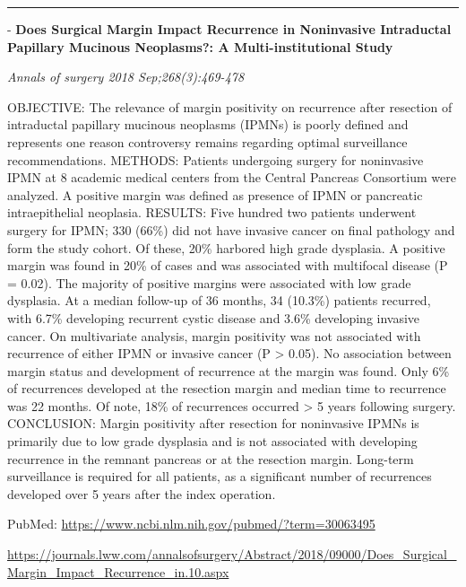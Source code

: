 \documentclass[]{article}
\begin{document}
\begin{center}\rule{0.5\linewidth}{\linethickness}\end{center}

 - \textbf{Does Surgical Margin Impact Recurrence in Noninvasive
Intraductal Papillary Mucinous Neoplasms?: A Multi-institutional Study}

\emph{Annals of surgery 2018 Sep;268(3):469-478}

OBJECTIVE: The relevance of margin positivity on recurrence after
resection of intraductal papillary mucinous neoplasms (IPMNs) is poorly
defined and represents one reason controversy remains regarding optimal
surveillance recommendations. METHODS: Patients undergoing surgery for
noninvasive IPMN at 8 academic medical centers from the Central Pancreas
Consortium were analyzed. A positive margin was defined as presence of
IPMN or pancreatic intraepithelial neoplasia. RESULTS: Five hundred two
patients underwent surgery for IPMN; 330 (66\%) did not have invasive
cancer on final pathology and form the study cohort. Of these, 20\%
harbored high grade dysplasia. A positive margin was found in 20\% of
cases and was associated with multifocal disease (P = 0.02). The
majority of positive margins were associated with low grade dysplasia.
At a median follow-up of 36 months, 34 (10.3\%) patients recurred, with
6.7\% developing recurrent cystic disease and 3.6\% developing invasive
cancer. On multivariate analysis, margin positivity was not associated
with recurrence of either IPMN or invasive cancer (P \textgreater{}
0.05). No association between margin status and development of
recurrence at the margin was found. Only 6\% of recurrences developed at
the resection margin and median time to recurrence was 22 months. Of
note, 18\% of recurrences occurred \textgreater{} 5 years following
surgery. CONCLUSION: Margin positivity after resection for noninvasive
IPMNs is primarily due to low grade dysplasia and is not associated with
developing recurrence in the remnant pancreas or at the resection
margin. Long-term surveillance is required for all patients, as a
significant number of recurrences developed over 5 years after the index
operation.

PubMed: \url{https://www.ncbi.nlm.nih.gov/pubmed/?term=30063495}

\url{https://journals.lww.com/annalsofsurgery/Abstract/2018/09000/Does_Surgical_Margin_Impact_Recurrence_in.10.aspx}

{}

{}
\end{document}
